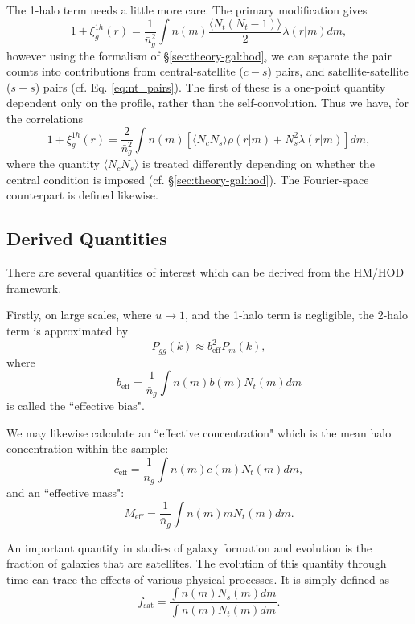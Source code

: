\documentclass[5p,aas_macros]{elsarticle}
\begin{document}
The 1-halo term needs a little more care. The primary modification gives
\begin{equation}
\label{eq:galcoor1}
1 + \xi_g^{1h}(r) = \frac{1}{\bar{n}_g^2}\int n(m) \frac{\langle N_t(N_t-1) \rangle}{2} \lambda(r|m) dm,
\end{equation}
however using the formalism of \S\ref{sec:theory-gal:hod}, we can separate the pair counts into contributions from central-satellite ($c-s$) pairs, and satellite-satellite ($s-s$) pairs (cf. Eq. \ref{eq:nt_pairs}). The first of these is a one-point quantity dependent only on the profile, rather than the self-convolution. Thus we have, for the correlations
\begin{equation}
1 + \xi_g^{1h}(r) = \frac{2}{\bar{n}_g^2}\int n(m) \left[\langle N_c N_s \rangle \rho(r|m) + N_s^2 \lambda(r|m)\right] dm,
\end{equation}
where the quantity $\langle N_c N_s \rangle$ is treated differently depending on whether the central condition is imposed (cf. \S\ref{sec:theory-gal:hod}). The Fourier-space counterpart is defined likewise.




\subsection{Derived Quantities}
There are several quantities of interest which can be derived from the HM/HOD framework.

Firstly, on large scales, where $u\rightarrow1$, and the 1-halo term is negligible, the 2-halo term is approximated by
\begin{equation}
 P_{gg}(k) \approx b^2_\text{eff}P_m(k),
\end{equation}
where
\begin{equation}
\label{eq:beff}
 b_\text{eff} = \frac{1}{\bar{n}_g}\int n(m)b(m)N_t(m) dm
\end{equation}
is called the ``effective bias".

We may likewise calculate an ``effective concentration" which is the mean halo concentration within the sample:
\begin{equation}
     c_\text{eff} = \frac{1}{\bar{n}_g}\int n(m)c(m)N_t(m) dm,
\end{equation}
and an ``effective mass":
\begin{equation}
     M_\text{eff} = \frac{1}{\bar{n}_g}\int n(m)mN_t(m) dm.
\end{equation}

An important quantity in studies of galaxy formation and evolution is the fraction of galaxies that are satellites. The evolution of this quantity through time can trace the effects of various physical processes. It is simply defined as
\begin{equation}
    f_\text{sat} = \frac{\int n(m) N_s(m) dm}{\int n(m) N_t(m) dm}.
\end{equation}
\end{document}
